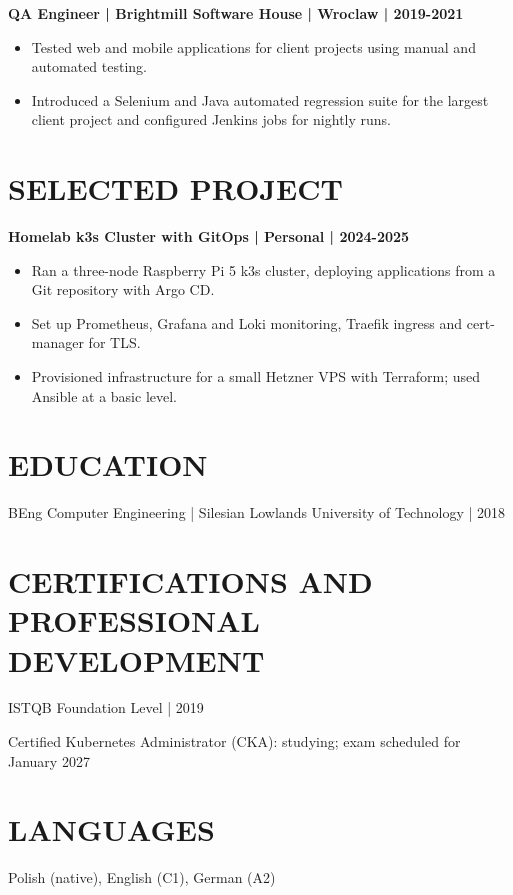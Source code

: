 \documentclass[10pt,a4paper]{article}
\newcommand{\cvsection}[1]{\section*{#1}}
\newcommand{\cvrole}[1]{\textbf{#1}\par}
\begin{document}
\cvrole{QA Engineer | Brightmill Software House | Wroclaw | 2019-2021}
\begin{itemize}
\item Tested web and mobile applications for client projects using manual and automated testing.
\item Introduced a Selenium and Java automated regression suite for the largest client project and configured Jenkins jobs for nightly runs.
\end{itemize}

\cvsection{SELECTED PROJECT}
\cvrole{Homelab k3s Cluster with GitOps | Personal | 2024-2025}
\begin{itemize}
\item Ran a three-node Raspberry Pi 5 k3s cluster, deploying applications from a Git repository with Argo CD.
\item Set up Prometheus, Grafana and Loki monitoring, Traefik ingress and cert-manager for TLS.
\item Provisioned infrastructure for a small Hetzner VPS with Terraform; used Ansible at a basic level.
\end{itemize}

\cvsection{EDUCATION}
BEng Computer Engineering | Silesian Lowlands University of Technology | 2018

\cvsection{CERTIFICATIONS AND PROFESSIONAL DEVELOPMENT}
ISTQB Foundation Level | 2019\par
Certified Kubernetes Administrator (CKA): studying; exam scheduled for January 2027

\cvsection{LANGUAGES}
Polish (native), English (C1), German (A2)
\end{document}
